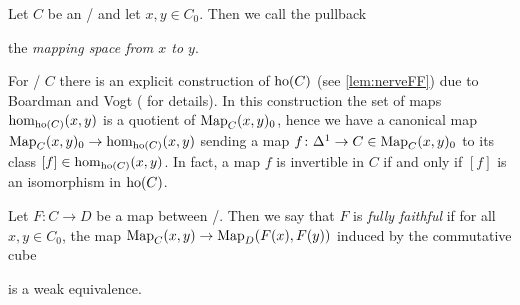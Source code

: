 \begin{definition}\label{def:mappingSpace}
    Let $C$ be an \inftycat/ and let $x,y\in C_0$. 
    Then we call the pullback 
    \begin{center}
    \end{center}
    the \emph{mapping space from $x$ to $y$}.
\end{definition}
\begin{remark}\label{rmk:boardmanVogt}
    For \inftycats/ $C$ there is an explicit construction of $\operatorname{ho}(C)$ (see \cref{lem:nerveFF}) due to Boardman and Vogt (\cite[Theorem 1.6.6]{cisinski_2019} for details).
    In this construction the set of maps $\hom_{\operatorname{ho}(C)}(x,y)$ is a quotient of $\operatorname{Map}_C(x,y)_0$, hence we have a canonical map $\operatorname{Map}_C(x,y)_0\to\hom_{\operatorname{ho}(C)}(x,y)$ sending a map $f\colon\Delta^1\to C\in\operatorname{Map}_C(x,y)_0$ to its class $[f]\in\hom_{\operatorname{ho}(C)}(x,y)$.
    In fact, a map $f$ is invertible in $C$ if and only if $[f]$ is an isomorphism in $\operatorname{ho}(C)$.
\end{remark}
\begin{definition}
    Let $F\colon C\to D$ be a map between \inftycats/.
    Then we say that $F$ is \emph{fully faithful} if for all $x,y\in C_0$, the map $\operatorname{Map}_C(x,y)\to\operatorname{Map}_D(F(x),F(y))$ induced by the commutative cube
    \begin{center}
    \end{center}
    is a weak equivalence.
\end{definition}
